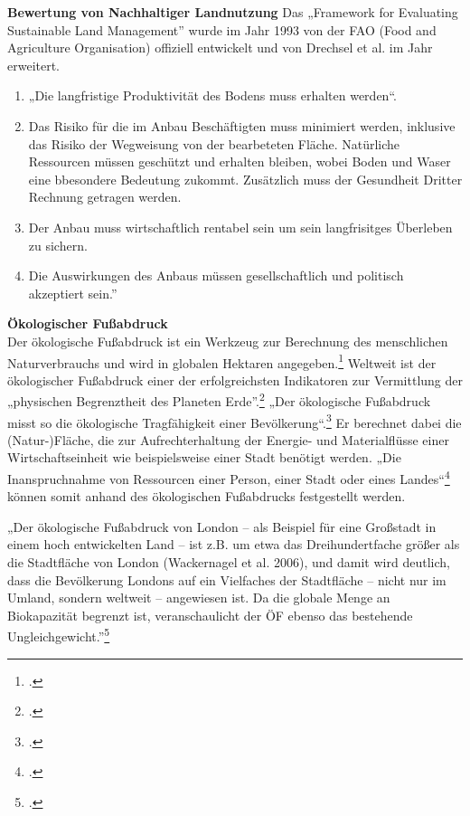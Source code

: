 \documentclass{scrartcl}
\begin{document}
\textbf{Bewertung von Nachhaltiger Landnutzung}
Das „Framework for Evaluating Sustainable Land Management” wurde im Jahr 1993 von der FAO (Food and Agriculture Organisation) offiziell entwickelt und von Drechsel et al. im Jahr erweitert.

\begin{enumerate}
    \item „Die langfristige Produktivität des Bodens muss erhalten werden“.
    \item Das Risiko für die im Anbau Beschäftigten muss minimiert werden, inklusive das Risiko der Wegweisung von der bearbeteten Fläche.
    Natürliche Ressourcen müssen geschützt und erhalten bleiben, wobei Boden und Waser eine bbesondere Bedeutung zukommt. Zusätzlich muss der Gesundheit Dritter Rechnung getragen werden.
    \item Der Anbau muss wirtschaftlich rentabel sein um sein langfrisitges Überleben zu sichern.
    \item Die Auswirkungen des Anbaus müssen gesellschaftlich und politisch akzeptiert sein.”
\end{enumerate}

\textbf{Ökologischer Fußabdruck}\\
Der ökologische Fußabdruck ist ein Werkzeug zur Berechnung des menschlichen Naturverbrauchs und wird in globalen Hektaren angegeben.\footcite[S. 25]{MathisWackernagelUnserNimmt} Weltweit ist der ökologischer Fußabdruck einer der erfolgreichsten Indikatoren zur Vermittlung der „physischen Begrenztheit des Planeten Erde”.\footcite[S.2]{StefanGiljum2007WissenschaftlicheFuabdruck}
 „Der ökologische Fußabdruck misst so die ökologische Tragfähigkeit einer Bevölkerung“.\footcites[S.5]{MichelsenGrundlagenEntwicklung}[Vgl.][S.23ff]{MathisWackernagelUnserNimmt} Er berechnet dabei die  (Natur-)Fläche, die zur Aufrechterhaltung der Energie- und Materialflüsse einer Wirtschaftseinheit wie beispielsweise einer Stadt benötigt werden. 
„Die Inanspruchnahme von Ressourcen einer Person, einer Stadt oder eines Landes“\footcite[S.192]{AntjeFlade2015StadtStadtforschung} können somit anhand des ökologischen Fußabdrucks festgestellt werden. 

\begin{displayquote}
„Der ökologische Fußabdruck von London – als Beispiel für eine Großstadt in einem hoch entwickelten Land – ist z.B. um etwa das Dreihundertfache größer als die Stadtfläche von London (Wackernagel et al. 2006), und damit wird deutlich, dass die Bevölkerung Londons auf ein Vielfaches der Stadtfläche – nicht nur im Umland, sondern weltweit – angewiesen ist. Da die globale Menge an Biokapazität begrenzt ist, veranschaulicht der ÖF ebenso das bestehende Ungleichgewicht.”\footcite{AntjeFlade2015StadtStadtforschung, S.192}
\end{displayquote} 
\end{document}

